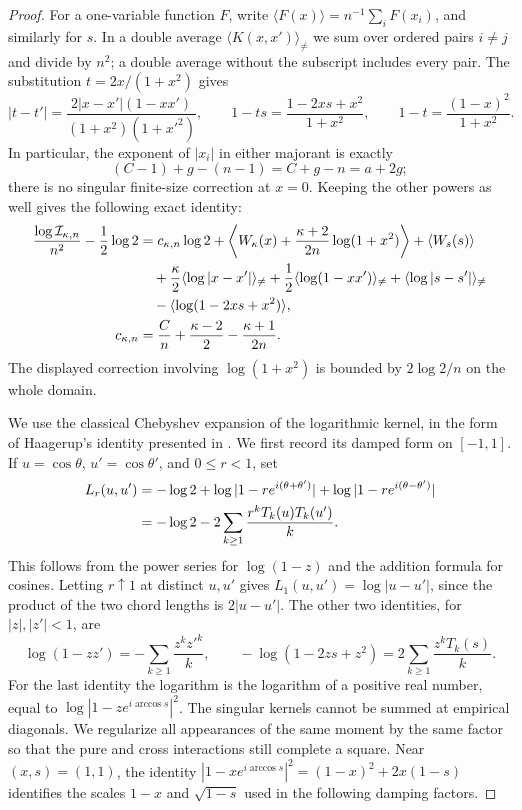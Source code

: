 \begin{proof}
For a one-variable function $F$, write
$\langle F(x)\rangle=n^{-1}\sum_iF(x_i)$, and similarly for $s$.
In a double average $\langle K(x,x')\rangle_{\ne}$ we sum over ordered
pairs $i\ne j$ and divide by $n^2$; a double average without the subscript
includes every pair.  The substitution $t=2x/(1+x^2)$ gives
\begin{equation}\label{eq:energy-transform-identities}
 |t-t'|=\frac{2|x-x'|(1-xx')}{(1+x^2)(1+x'^2)},\qquad
 1-ts=\frac{1-2xs+x^2}{1+x^2},\qquad
 1-t=\frac{(1-x)^2}{1+x^2}.
\end{equation}
In particular, the exponent of $|x_i|$ in either majorant is exactly
\[
 (C-1)+g-(n-1)=C+g-n=a+2g;
\]
there is no singular finite-size correction at $x=0$.
Keeping the other powers as well gives the following exact identity:
\begin{align}
 \frac{\log\mathcal I_{\kappa,n}}{n^2}-\frac12\log2
 &=c_{\kappa,n}\log2
   +\left\langle W_\kappa(x)+\frac{\kappa+2}{2n}\log(1+x^2)\right\rangle
   +\langle W_s(s)\rangle\notag\\
 &\quad+\frac\kappa2\langle\log|x-x'|\rangle_{\ne}
       +\frac12\langle\log(1-xx')\rangle_{\ne}
       +\langle\log|s-s'|\rangle_{\ne}\notag\\
 &\quad-\langle\log(1-2xs+x^2)\rangle,
 \label{eq:energy-exact-finite}\\
 c_{\kappa,n}&=\frac Cn+\frac{\kappa-2}{2}
                       -\frac{\kappa+1}{2n}.\notag
\end{align}
The displayed correction involving $\log(1+x^2)$ is bounded by
$2\log2/n$ on the whole domain.

We use the classical Chebyshev expansion of the logarithmic kernel,
in the form of Haagerup's identity presented in
\cite[Lemma~3.1 and its proof]{GaroufalidisPopescu2013}.
We first record its damped form on $[-1,1]$. If
$u=\cos\theta$, $u'=\cos\theta'$, and $0\le r<1$, set
\begin{align}
 L_r(u,u')
 &=-\log2+\log|1-re^{i(\theta+\theta')}|
                 +\log|1-re^{i(\theta-\theta')}|\notag\\
 &=-\log2-2\sum_{k\ge1}\frac{r^kT_k(u)T_k(u')}{k}.
 \label{eq:energy-cosine-kernel}
\end{align}
This follows from the power series for $\log(1-z)$ and the addition
formula for cosines.  Letting $r\uparrow1$ at distinct $u,u'$ gives
$L_1(u,u')=\log|u-u'|$, since the product of the two chord lengths
is $2|u-u'|$.  The other two identities, for $|z|,|z'|<1$, are
\begin{equation}\label{eq:energy-power-cross-kernels}
 \log(1-zz')=-\sum_{k\ge1}\frac{z^kz'^k}{k},\qquad
 -\log(1-2zs+z^2)=2\sum_{k\ge1}\frac{z^kT_k(s)}{k}.
\end{equation}
For the last identity the logarithm is the logarithm of a positive real
number, equal to $\log|1-ze^{i\arccos s}|^2$.
The singular kernels cannot be summed at empirical diagonals. We
regularize all appearances of the same moment by the same factor so
that the pure and cross interactions still complete a square. Near
$(x,s)=(1,1)$, the identity
$|1-xe^{i\arccos s}|^2=(1-x)^2+2x(1-s)$ identifies the scales
$1-x$ and $\sqrt{1-s}$ used in the following damping factors.


\end{proof}
